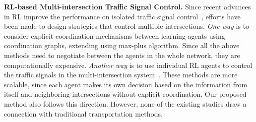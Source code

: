 \textbf{RL-based Multi-intersection Traffic Signal Control.}
Since recent advances in RL improve the performance on isolated traffic signal control~\cite{VaOl16,wei2018intellilight}, efforts have been made to design strategies that control multiple intersections. \textit{One way} is to consider explicit coordination mechanisms between learning agents using coordination graphs\cite{KWBV08,VaOl16}, extending \cite{Wier00} using max-plus algorithm. Since all the above methods need to negotiate between the agents in the whole network, they are computationally expensive. \textit{Another way} is to use individual RL agents to control the traffic signals in the multi-intersection system~\cite{ElAA13,ALUK10,da2006adaptive}. These methods are more scalable, since each agent makes its own decision based on the information from itself and neighboring intersections without explicit coordination. Our proposed method also follows this direction. However, none of the existing studies draw a connection with traditional transportation methods. 


